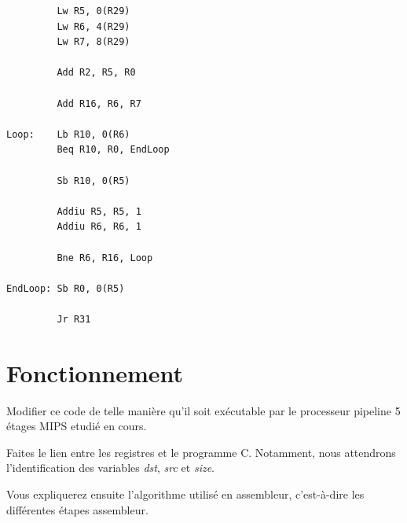 \begin{verbatim}
         Lw R5, 0(R29)
         Lw R6, 4(R29)
         Lw R7, 8(R29)

         Add R2, R5, R0

         Add R16, R6, R7

Loop:    Lb R10, 0(R6)
         Beq R10, R0, EndLoop

         Sb R10, 0(R5)

         Addiu R5, R5, 1
         Addiu R6, R6, 1

         Bne R6, R16, Loop

EndLoop: Sb R0, 0(R5)

         Jr R31
\end{verbatim}

%
%

\section{Fonctionnement}

Modifier ce code de telle mani\`ere qu'il soit ex\'ecutable par le processeur
pipeline 5 \'etages MIPS etudi\'e en cours.

Faites le lien entre les registres et le programme C. Notamment,
nous attendrons l'identification des variables \textit{dst}, \textit{src}
et \textit{size}.

Vous expliquerez ensuite l'algorithme utilis\'e en assembleur, c'est-\`a-dire
les diff\'erentes \'etapes assembleur.

